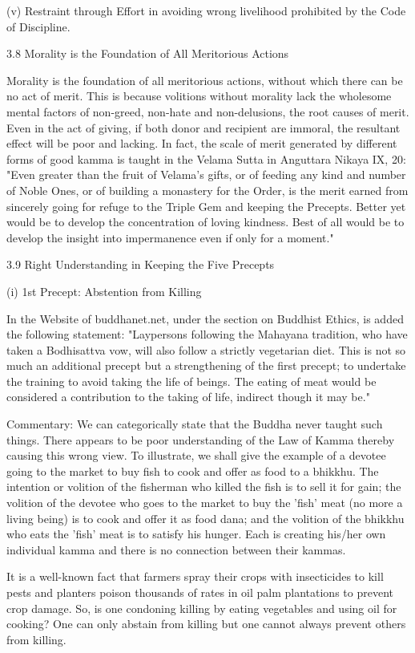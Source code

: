 (v) Restraint through Effort in avoiding wrong livelihood prohibited by the Code of Discipline.

3.8 Morality is the Foundation of All Meritorious Actions

Morality is the foundation of all meritorious actions, without which there can be no act of merit. This is because volitions without morality lack the wholesome mental factors of non-greed, non-hate and non-delusions, the root causes of merit. Even in the act of giving, if both donor and recipient are immoral, the resultant effect will be poor and lacking. In fact, the scale of merit generated by different forms of good kamma is taught in the Velama Sutta in Anguttara Nikaya IX, 20: "Even greater than the fruit of Velama's gifts, or of feeding any kind and number of Noble Ones, or of building a monastery for the Order, is the merit earned from sincerely going for refuge to the Triple Gem and keeping the Precepts. Better yet would be to develop the concentration of loving kindness. Best of all would be to develop the insight into impermanence even if only for a moment."

3.9 Right Understanding in Keeping the Five Precepts

(i) 1st Precept: Abstention from Killing

In the Website of buddhanet.net, under the section on Buddhist Ethics, is added the following statement: "Laypersons following the Mahayana tradition, who have taken a Bodhisattva vow, will also follow a strictly vegetarian diet. This is not so much an additional precept but a strengthening of the first precept; to undertake the training to avoid taking the life of beings. The eating of meat would be considered a contribution to the taking of life, indirect though it may be."

Commentary: We can categorically state that the Buddha never taught such things. There appears to be poor understanding of the Law of Kamma thereby causing this wrong view. To illustrate, we shall give the example of a devotee going to the market to buy fish to cook and offer as food to a bhikkhu. The intention or volition of the fisherman who killed the fish is to sell it for gain; the volition of the devotee who goes to the market to buy the 'fish' meat (no more a living being) is to cook and offer it as food dana; and the volition of the bhikkhu who eats the 'fish' meat is to satisfy his hunger. Each is creating his/her own individual kamma and there is no connection between their kammas.

It is a well-known fact that farmers spray their crops with insecticides to kill pests and planters poison thousands of rates in oil palm plantations to prevent crop damage. So, is one condoning killing by eating vegetables and using oil for cooking? One can only abstain from killing but one cannot always prevent others from killing.

